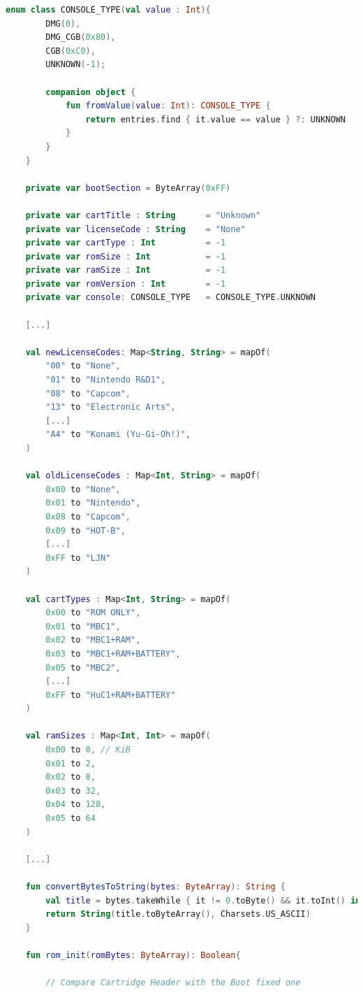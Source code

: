 \begin{lstlisting}[language=Kotlin, caption={Carga de ROM y manejo de errores durante el proceso.}, label={code:kotlinloadromread}]
    enum class CONSOLE_TYPE(val value : Int){
        DMG(0),
        DMG_CGB(0x80),
        CGB(0xC0),
        UNKNOWN(-1);

        companion object {
            fun fromValue(value: Int): CONSOLE_TYPE {
                return entries.find { it.value == value } ?: UNKNOWN
            }
        }
    }
    
    private var bootSection = ByteArray(0xFF)

    private var cartTitle : String      = "Unknown"
    private var licenseCode : String    = "None"
    private var cartType : Int          = -1
    private var romSize : Int           = -1
    private var ramSize : Int           = -1
    private var romVersion : Int        = -1
    private var console: CONSOLE_TYPE   = CONSOLE_TYPE.UNKNOWN

    [...]

    val newLicenseCodes: Map<String, String> = mapOf(
        "00" to "None",
        "01" to "Nintendo R&D1",
        "08" to "Capcom",
        "13" to "Electronic Arts",
        [...]
        "A4" to "Konami (Yu-Gi-Oh!)",
    )

    val oldLicenseCodes : Map<Int, String> = mapOf(
        0x00 to "None",
        0x01 to "Nintendo",
        0x08 to "Capcom",
        0x09 to "HOT-B",
        [...]
        0xFF to "LJN"
    )

    val cartTypes : Map<Int, String> = mapOf(
        0x00 to "ROM ONLY",
        0x01 to "MBC1",
        0x02 to "MBC1+RAM",
        0x03 to "MBC1+RAM+BATTERY",
        0x05 to "MBC2",
        [...]
        0xFF to "HuC1+RAM+BATTERY"
    )

    val ramSizes : Map<Int, Int> = mapOf(
        0x00 to 0, // KiB
        0x01 to 2,
        0x02 to 8,
        0x03 to 32,
        0x04 to 128,
        0x05 to 64
    )

    [...]

    fun convertBytesToString(bytes: ByteArray): String {
        val title = bytes.takeWhile { it != 0.toByte() && it.toInt() in 32..126 } // Filter only ASCII characters
        return String(title.toByteArray(), Charsets.US_ASCII)
    }

    fun rom_init(romBytes: ByteArray): Boolean{

        // Compare Cartridge Header with the Boot fixed one


\end{lstlisting}
